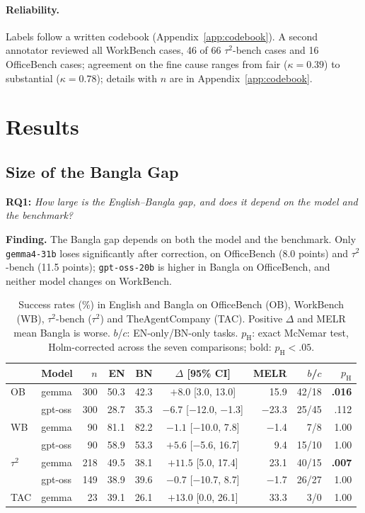 \documentclass[11pt]{article}
\newcommand{\gemma}{\texttt{gemma4-31b}}
\newcommand{\gptoss}{\texttt{gpt-oss-20b}}
\newcommand{\OB}{OfficeBench}
\newcommand{\WB}{WorkBench}
\newcommand{\TAU}{$\tau^2$-bench}
\newcommand{\TAC}{TheAgentCompany}
\begin{document}
\paragraph{Reliability.} Labels follow a written codebook (Appendix~\ref{app:codebook}). A
second annotator reviewed all \WB{} cases, 46 of 66 \TAU{} cases and 16 \OB{} cases; agreement on
the fine cause ranges from fair ($\kappa=0.39$) to substantial ($\kappa=0.78$); details with $n$ are
in Appendix~\ref{app:codebook}.

\section{Results}

\subsection{Size of the Bangla Gap}
\label{sec:rq1}

\noindent\textbf{RQ1:} \emph{How large is the English--Bangla gap, and does it depend on the model and the benchmark?}

\noindent\textbf{Finding.} The Bangla gap depends on both the model and the benchmark. Only
\gemma{} loses significantly after correction, on \OB{} (8.0 points) and \TAU{} (11.5 points);
\gptoss{} is higher in Bangla on \OB{}, and neither model changes on \WB{}.

\begin{table}[t]
\centering\small
\setlength{\tabcolsep}{6pt}
\begin{tabular}{llrrrcrrr}
\toprule
 & Model & $n$ & EN & BN & $\Delta$ [95\% CI] & MELR & $b$/$c$ & $p_{\mathrm{H}}$ \\
\midrule
OB  & gemma   & 300 & 50.3 & 42.3 & $+8.0$ [3.0, 13.0]        & 15.9   & 42/18 & \textbf{.016} \\
    & gpt-oss & 300 & 28.7 & 35.3 & $-6.7$ [$-$12.0, $-$1.3]  & $-$23.3 & 25/45 & .112 \\
WB  & gemma   & 90  & 81.1 & 82.2 & $-1.1$ [$-$10.0, 7.8]     & $-$1.4 & 7/8   & 1.00 \\
    & gpt-oss & 90  & 58.9 & 53.3 & $+5.6$ [$-$5.6, 16.7]     & 9.4    & 15/10 & 1.00 \\
$\tau^2$ & gemma & 218 & 49.5 & 38.1 & $+11.5$ [5.0, 17.4]   & 23.1   & 40/15 & \textbf{.007} \\
    & gpt-oss & 149 & 38.9 & 39.6 & $-0.7$ [$-$10.7, 8.7]     & $-$1.7 & 26/27 & 1.00 \\
TAC & gemma   & 23  & 39.1 & 26.1 & $+13.0$ [0.0, 26.1]       & 33.3   & 3/0   & 1.00 \\
\bottomrule
\end{tabular}
\caption{Success rates (\%) in English and Bangla on \OB{} (OB), \WB{} (WB), \TAU{} ($\tau^2$)
and \TAC{} (TAC). Positive $\Delta$ and MELR mean Bangla is worse. $b$/$c$: EN-only/BN-only tasks.
$p_{\mathrm{H}}$: exact McNemar test, Holm-corrected across the seven comparisons; bold:
$p_{\mathrm{H}}<.05$.}
\label{tab:rq1}
\end{table}
\end{document}
